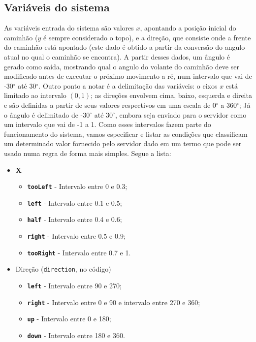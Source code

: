 \documentclass{article}
\begin{document}
    \subsection*{Variáveis do sistema}
        As variáveis entrada do sistema são valores $x$, apontando a posição
        inicial do caminhão ($y$ é sempre considerado o topo), e a direção, que
        consiste onde a frente do caminhão está apontado (este dado é obtido a
        partir da conversão do angulo atual no qual o caminhão se encontra). A
        partir desses dados, um ângulo é gerado como saída, mostrando qual o
        angulo do volante do caminhão deve ser modificado antes de executar o
        próximo movimento a ré, num intervalo que vai de -30$^\circ$ até
        30$^\circ$. Outro ponto a notar é a delimitação das variáveis: o eixos
        $x$ está limitado ao intervalo $(0, 1)$; as direções envolvem cima,
        baixo, esquerda e direita e são definidas a partir de seus valores
        respectivos em uma escala de 0$^\circ$ a 360$^\circ$; Já o ângulo é
        delimitado de -30$^\circ$ até 30$^\circ$, embora seja enviado para o
        servidor como um intervalo que vai de -1 a 1. Como esses intervalos
        fazem parte do funcionamento do sistema, vamos especificar e listar as
        condições que classificam um determinado valor fornecido pelo servidor
        dado em um termo que pode ser usado numa regra de forma mais simples.
        Segue a lista:
        \begin{itemize}
            \item \textbf{X}
                \begin{itemize}
                    \item \texttt{\textbf{tooLeft}} - Intervalo entre 0 e 0.3;
                    \item \texttt{\textbf{left}} - Intervalo entre 0.1 e 0.5;
                    \item \texttt{\textbf{half}} - Intervalo entre 0.4 e 0.6;
                    \item \texttt{\textbf{right}} - Intervalo entre 0.5 e 0.9;
                    \item \texttt{\textbf{tooRight}} - Intervalo entre 0.7 e 1.
                \end{itemize}

            \item Direção (\texttt{direction}, no código)
                \begin{itemize}
                    \item \texttt{\textbf{left}} - Intervalo entre 90 e 270;
                    \item \texttt{\textbf{right}} - Intervalo entre 0 e 90 e
                        intervalo entre 270 e 360;
                    \item \texttt{\textbf{up}} - Intervalo entre 0 e 180;
                    \item \texttt{\textbf{down}} - Intervalo entre 180 e 360.
                \end{itemize}
        \end{itemize}
        
\end{document}
